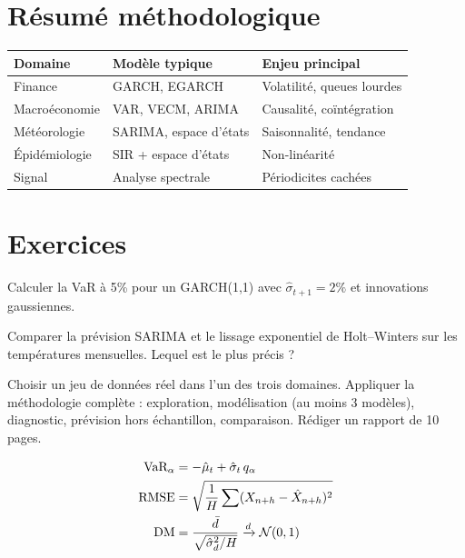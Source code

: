 \section{R\'esum\'e m\'ethodologique}

\begin{center}
\begin{tabular}{lll}
\toprule
\textbf{Domaine} & \textbf{Mod\`ele typique} & \textbf{Enjeu principal} \\
\midrule
Finance & GARCH, EGARCH & Volatilit\'e, queues lourdes \\
Macro\'economie & VAR, VECM, ARIMA & Causalit\'e, co\"int\'egration \\
M\'et\'eorologie & SARIMA, espace d'\'etats & Saisonnalit\'e, tendance \\
\'Epid\'emiologie & SIR + espace d'\'etats & Non-lin\'earit\'e \\
Signal & Analyse spectrale & P\'eriodicites cach\'ees \\
\bottomrule
\end{tabular}
\end{center}

\section{Exercices}

\begin{exercice}[$\star$]
Calculer la VaR \`a 5\% pour un GARCH(1,1) avec $\hat\sigma_{t+1}=2\%$ et innovations gaussiennes.
\end{exercice}

\begin{exercice}[$\star\star$]
Comparer la pr\'evision SARIMA et le lissage exponentiel de Holt--Winters sur les temp\'eratures mensuelles. Lequel est le plus pr\'ecis ?
\end{exercice}

\begin{exercice}
Choisir un jeu de donn\'ees r\'eel dans l'un des trois domaines. Appliquer la m\'ethodologie compl\`ete : exploration, mod\'elisation (au moins 3 mod\`eles), diagnostic, pr\'evision hors \'echantillon, comparaison. R\'ediger un rapport de 10 pages.
\end{exercice}

\begin{formules}
\begin{align*}
\text{VaR}_\alpha &= -\hat\mu_t + \hat\sigma_t\,q_\alpha \\
\text{RMSE} &= \sqrt{\frac{1}{H}\sum(X_{n+h}-\hat{X}_{n+h})^2} \\
\text{DM} &= \frac{\bar{d}}{\sqrt{\hat\sigma_d^2/H}}\xrightarrow{d}\mathcal{N}(0,1)
\end{align*}
\end{formules}
